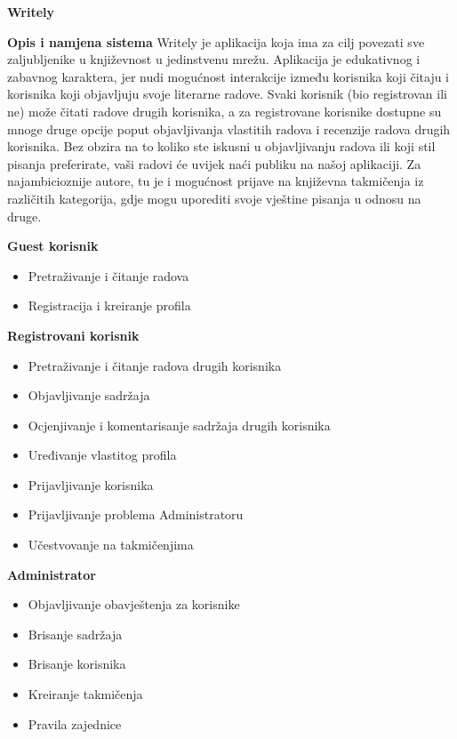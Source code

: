 \documentclass[12pt, a4paper]{report}
\begin{document}
\begin{flushleft}
{\Large \textbf{Writely}} \newline \newline

\large  
\textbf{Opis i namjena sistema} \newline
Writely je aplikacija koja ima za cilj povezati sve zaljubljenike u književnost u jedinstvenu mrežu. Aplikacija je edukativnog i zabavnog karaktera, jer nudi mogućnost interakcije između korisnika koji čitaju i korisnika koji objavljuju svoje literarne radove. Svaki korisnik (bio registrovan ili ne) može čitati radove drugih korisnika, a za registrovane korisnike dostupne su mnoge druge opcije poput objavljivanja vlastitih radova i recenzije radova drugih korisnika. Bez obzira na to koliko ste iskusni u objavljivanju radova ili koji stil pisanja preferirate, vaši radovi će uvijek naći publiku na našoj aplikaciji. Za najambicioznije autore, tu je i mogućnost prijave na književna takmičenja iz različitih kategorija, gdje mogu uporediti svoje vještine pisanja u odnosu na druge. \newline

\textbf{Guest korisnik}
\begin{itemize}
    \item Pretraživanje i čitanje radova 
    \item Registracija i kreiranje profila \newline
\end{itemize}

\textbf{Registrovani korisnik}
\begin{itemize}
   \item Pretraživanje i čitanje radova drugih korisnika 
   \item Objavljivanje sadržaja 
   \item Ocjenjivanje i komentarisanje sadržaja drugih korisnika 
   \item Uređivanje vlastitog profila 
   \item Prijavljivanje korisnika 
   \item Prijavljivanje problema Administratoru 
   \item Učestvovanje na takmičenjima \newline
\end{itemize}

\textbf{Administrator}
\begin{itemize}
    \item Objavljivanje obavještenja za korisnike 
    \item Brisanje sadržaja
    \item Brisanje korisnika
    \item Kreiranje takmičenja 
    \item Pravila zajednice     \newline
\end{itemize}


\end{flushleft}
\end{document}
